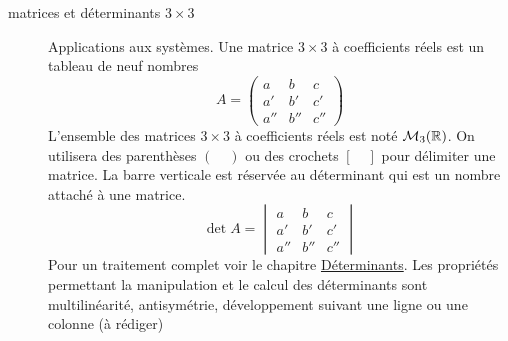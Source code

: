 \begin{description}
\item[matrices et déterminants $3\times3$] Applications aux systèmes.\newline
Une matrice $3\times3$ à coefficients réels est un tableau de neuf nombres
\begin{displaymath}
A=
 \begin{pmatrix}
  a & b & c\\
  a' & b'& c' \\
 a'' & b'' & c''
 \end{pmatrix}
\end{displaymath}
L'ensemble des matrices $3\times3$ à coefficients réels est noté $\mathcal M_3(\mathbb{R})$. On utilisera des parenthèses $(\phantom{aa} )$ ou des crochets $[ \phantom{aa}]$ pour délimiter une matrice. La barre verticale est réservée au déterminant qui est un nombre attaché à une matrice.
\begin{displaymath}
 \det A =  \begin{vmatrix}
  a & b & c\\
  a' & b'& c' \\
 a'' & b'' & c''
 \end{vmatrix}
\end{displaymath}
Pour un traitement complet voir le chapitre \href{\baseurl C2261.pdf}{Déterminants}.\newline
Les propriétés permettant la manipulation et le calcul des déterminants sont multilinéarité, antisymétrie, développement suivant une ligne ou une colonne (à rédiger)


\end{description}
